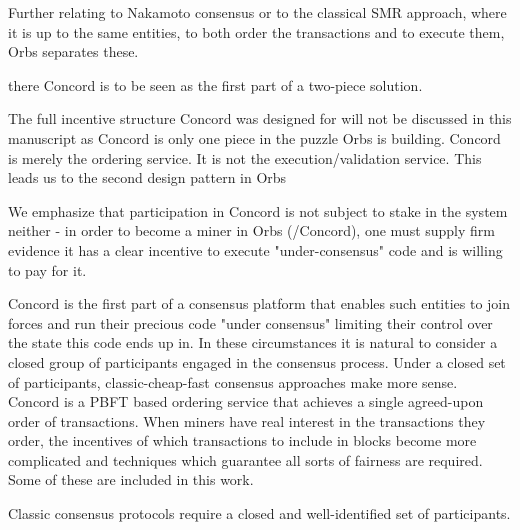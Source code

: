 Further relating to Nakamoto consensus or to the classical SMR approach, where it is up to the same entities, to both order the transactions and to execute them, Orbs separates these.



there Concord is to be seen as the first part of a two-piece solution. 

The full incentive structure Concord was designed for will not be discussed in this manuscript as Concord is only one piece in the puzzle Orbs is building. Concord is merely the ordering service. It is not the execution/validation service. This leads us to the second design pattern in Orbs 

We emphasize that participation in Concord is not subject to stake in the system neither - in order to become a miner in Orbs (/Concord), one must supply firm evidence it has a clear incentive to execute "under-consensus" code and is willing to pay for it. 

Concord is the first part of a consensus platform that enables such entities to join forces and run their precious code "under consensus" limiting their control over the state this code ends up in. In these circumstances it is natural to consider a closed group of participants engaged in the consensus process. Under a closed set of participants, classic-cheap-fast consensus approaches make more sense. Concord is a PBFT based ordering service that achieves a single agreed-upon order of transactions.
When miners have real interest in the transactions they order, the incentives of which transactions to include in blocks become more complicated and techniques which guarantee all sorts of fairness are required. Some of these are included in this work. 

Classic consensus protocols require a closed and well-identified set of participants.





